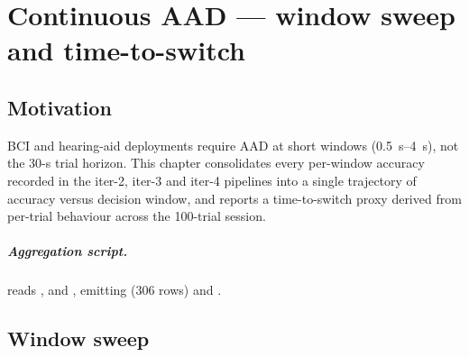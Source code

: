 \chapter{Continuous AAD --- window sweep and time-to-switch}
\label{ch:continuous-aad}

\section{Motivation}

BCI and hearing-aid deployments require AAD at short windows
(\SIrange{0.5}{4}{\second}), not the 30-s trial horizon. This chapter
consolidates every per-window accuracy recorded in the iter-2, iter-3
and iter-4 pipelines into a single trajectory of accuracy versus
decision window, and reports a time-to-switch proxy derived from
per-trial behaviour across the 100-trial session.

\paragraph{Aggregation script.}
 reads
, 
and , emitting
 (306 rows) and
.

\section{Window sweep}


